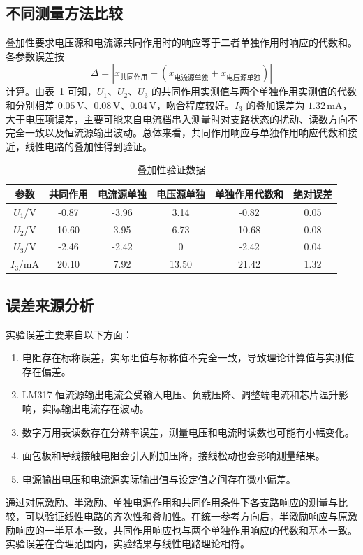 \subsection{不同测量方法比较}

叠加性要求电压源和电流源共同作用时的响应等于二者单独作用时响应的代数和。各参数误差按
\begin{equation}
    \Delta=\left|x_{\text{共同作用}}-\left(x_{\text{电流源单独}}+x_{\text{电压源单独}}\right)\right|
\end{equation}
计算。由表~\ref{e2-tab:superposition} 可知，\(U_1\)、\(U_2\)、\(U_3\) 的共同作用实测值与两个单独作用实测值的代数和分别相差 \(0.05\,\mathrm{V}\)、\(0.08\,\mathrm{V}\)、\(0.04\,\mathrm{V}\)，吻合程度较好。\(I_3\) 的叠加误差为 \(1.32\,\mathrm{mA}\)，大于电压项误差，主要可能来自电流档串入测量时对支路状态的扰动、读数方向不完全一致以及恒流源输出波动。总体来看，共同作用响应与单独作用响应代数和接近，线性电路的叠加性得到验证。

\begin{table}[H]
    \centering
    \caption{叠加性验证数据}
    \label{e2-tab:superposition}
    \begin{tabular}{cccccc}
        \toprule
        参数 & 共同作用 & 电流源单独 & 电压源单独 & 单独作用代数和 & 绝对误差 \\
        \midrule
        \(U_1\)/V & -0.87 & -3.96 & 3.14 & -0.82 & 0.05 \\
        \(U_2\)/V & 10.60 & 3.95 & 6.73 & 10.68 & 0.08 \\
        \(U_3\)/V & -2.46 & -2.42 & 0 & -2.42 & 0.04 \\
        \(I_3\)/mA & 20.10 & 7.92 & 13.50 & 21.42 & 1.32 \\
        \bottomrule
    \end{tabular}
\end{table}

\subsection{误差来源分析}

实验误差主要来自以下方面：
\begin{enumerate}[label=\arabic*.]
    \item 电阻存在标称误差，实际阻值与标称值不完全一致，导致理论计算值与实测值存在偏差。
    \item LM317 恒流源输出电流会受输入电压、负载压降、调整端电流和芯片温升影响，实际输出电流存在波动。
    \item 数字万用表读数存在分辨率误差，测量电压和电流时读数也可能有小幅变化。
    \item 面包板和导线接触电阻会引入附加压降，接线松动也会影响测量结果。
    \item 电源输出电压和电流源实际输出值与设定值之间存在微小偏差。
\end{enumerate}

通过对原激励、半激励、单独电源作用和共同作用条件下各支路响应的测量与比较，可以验证线性电路的齐次性和叠加性。在统一参考方向后，半激励响应与原激励响应的一半基本一致，共同作用响应也与两个单独作用响应的代数和基本一致。实验误差在合理范围内，实验结果与线性电路理论相符。

